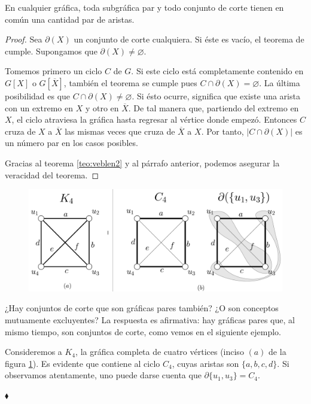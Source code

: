 \begin{teo} \label{teo:interseccionpar}
En cualquier gráfica, toda subgráfica par y todo conjunto de corte tienen en común una cantidad par de aristas.
\end{teo}

\begin{proof}
Sea $\partial(X)$ un conjunto de corte cualquiera. Si éste es vacío, el teorema de cumple. Supongamos que $\partial(X) \neq \varnothing$.

Tomemos primero un ciclo $C$ de $G$. Si este ciclo está completamente contenido en $G[X]$ o $G[\overline{X}]$, también el teorema se cumple pues $C \cap \partial(X) = \varnothing$. La última posibilidad es que $C \cap \partial(X) \neq \varnothing$. Si ésto ocurre, significa que existe una arista con un extremo en $X$ y otro en $\overline{X}$. De tal manera que, partiendo del extremo en $X$, el ciclo atraviesa la gráfica hasta regresar al vértice donde empezó. Entonces $C$ cruza de $X$ a $\overline{X}$ las mismas veces que cruza de $\overline{X}$ a $X$. Por tanto, $|C \cap \partial(X)|$ es un número par en los casos posibles.

Gracias al teorema \ref{teo:veblen2} y al párrafo anterior, podemos asegurar la veracidad del teorema.

\end{proof}

 \begin{figure}[t]
     \centering
     \includegraphics[scale=0.2]{img/imgchapter2/k4ciclocorte.jpg}
     \caption{}
     \label{fig:k4ciclocorte}
 \end{figure}
¿Hay conjuntos de corte que son gráficas pares también? ¿O son conceptos mutuamente excluyentes? La respuesta es afirmativa: hay gráficas pares que, al mismo tiempo, son conjuntos de corte, como vemos en el siguiente ejemplo.

\begin{ejem} \label{ejem:k4ciclocorte}
Consideremos a $K_{4}$, la gráfica completa de cuatro vértices (inciso $(a)$ de la figura \ref{fig:k4ciclocorte}). Es evidente que contiene al ciclo $C_{4}$, cuyas aristas son $\{a,b,c,d\}$. Si observamos atentamente, uno puede darse cuenta que $\partial{\{u_{1},u_{3}\}} = C_{4}$.

 \hfill $\blacklozenge$
\end{ejem}
 
